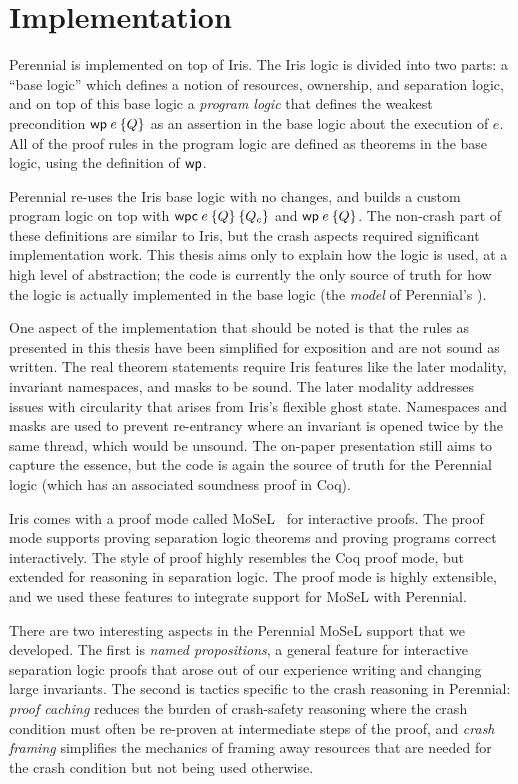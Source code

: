 \section{Implementation}
\label{sec:perennial:impl}

Perennial is implemented on top of Iris. The Iris logic is divided into two
parts: a ``base logic'' which defines a notion of resources, ownership, and
separation logic, and on top of this base logic a \emph{program logic} that
defines the weakest precondition $\wpre{e}{Q}$ as an assertion in the base logic
about the execution of $e$. All of the proof rules in the program logic are
defined as theorems in the base logic, using the definition of $\textsf{\upshape wp}$.

Perennial re-uses the Iris base logic with no changes, and builds a custom
program logic on top with $\wpc{e}{Q}{Q_{c}}$ and $\wpre{e}{Q}$. The non-crash
part of these definitions are similar to Iris, but the crash aspects required
significant implementation work. This thesis aims only to explain how the logic
is used, at a high level of abstraction; the code is currently the only
source of truth for how the logic is actually implemented in the base logic (the
\emph{model} of Perennial's \wpcw).

One aspect of the implementation that should be noted is that the rules as
presented in this thesis have been simplified for exposition and are not sound
as written. The real theorem statements require Iris features like the later modality,
invariant namespaces, and masks to be sound. The later modality addresses issues with circularity that
arises from Iris's flexible ghost state. Namespaces and masks are used to
prevent re-entrancy where an invariant is opened twice by the same thread, which
would be unsound. The
on-paper presentation still aims to capture the essence, but the code is again
the source of truth for the Perennial logic (which has an associated soundness
proof in Coq).

Iris comes with a proof mode called MoSeL~\cite{krebbers:ipm,krebbers:mosel} for
interactive proofs. The proof mode supports proving separation logic theorems
and proving programs correct interactively. The style of proof highly resembles
the Coq proof mode, but extended for reasoning in separation logic. The proof
mode is highly extensible, and we used these features to integrate support for
MoSeL with Perennial.

There are two interesting aspects in the Perennial MoSeL support that we
developed.
The first is \emph{named propositions}, a general feature for
interactive separation logic proofs that arose out of our experience writing and
changing large invariants. The second is tactics specific to the crash reasoning
in Perennial: \emph{proof caching} reduces the burden of crash-safety reasoning
where the crash condition must often be re-proven at intermediate steps of the
proof, and \emph{crash framing} simplifies the mechanics of framing away
resources that are needed for the crash condition but not being used otherwise.


